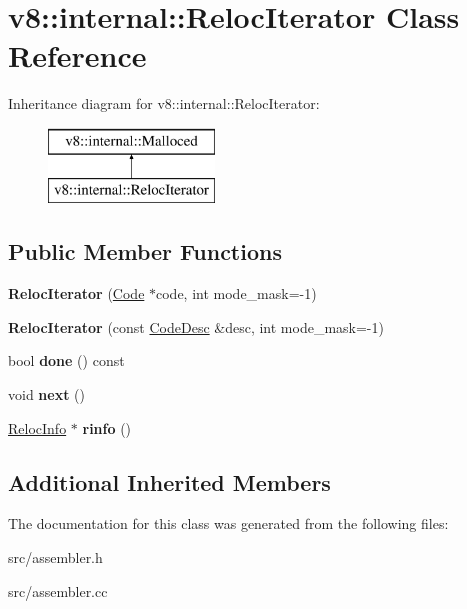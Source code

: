 \hypertarget{classv8_1_1internal_1_1_reloc_iterator}{}\section{v8\+:\+:internal\+:\+:Reloc\+Iterator Class Reference}
\label{classv8_1_1internal_1_1_reloc_iterator}
Inheritance diagram for v8\+:\+:internal\+:\+:Reloc\+Iterator\+:\begin{figure}[H]
\begin{center}
\leavevmode
\includegraphics[height=2.000000cm]{classv8_1_1internal_1_1_reloc_iterator}
\end{center}
\end{figure}
\subsection*{Public Member Functions}
\begin{DoxyCompactItemize}
\item 
\hypertarget{classv8_1_1internal_1_1_reloc_iterator_a43dacabd78f52d3771f87d0f7d268766}{}{\bfseries Reloc\+Iterator} (\hyperlink{classv8_1_1internal_1_1_code}{Code} $\ast$code, int mode\+\_\+mask=-\/1)\label{classv8_1_1internal_1_1_reloc_iterator_a43dacabd78f52d3771f87d0f7d268766}

\item 
\hypertarget{classv8_1_1internal_1_1_reloc_iterator_a861840bc6a67d6ca50beea9638133f70}{}{\bfseries Reloc\+Iterator} (const \hyperlink{structv8_1_1internal_1_1_code_desc}{Code\+Desc} \&desc, int mode\+\_\+mask=-\/1)\label{classv8_1_1internal_1_1_reloc_iterator_a861840bc6a67d6ca50beea9638133f70}

\item 
\hypertarget{classv8_1_1internal_1_1_reloc_iterator_afcee762df16f523a929920cf56735cb0}{}bool {\bfseries done} () const \label{classv8_1_1internal_1_1_reloc_iterator_afcee762df16f523a929920cf56735cb0}

\item 
\hypertarget{classv8_1_1internal_1_1_reloc_iterator_a92fcd0e86152eb3899352f7766b8bc05}{}void {\bfseries next} ()\label{classv8_1_1internal_1_1_reloc_iterator_a92fcd0e86152eb3899352f7766b8bc05}

\item 
\hypertarget{classv8_1_1internal_1_1_reloc_iterator_ac53f8a0cca6a7cc37f667295dfda7aea}{}\hyperlink{classv8_1_1internal_1_1_reloc_info}{Reloc\+Info} $\ast$ {\bfseries rinfo} ()\label{classv8_1_1internal_1_1_reloc_iterator_ac53f8a0cca6a7cc37f667295dfda7aea}

\end{DoxyCompactItemize}
\subsection*{Additional Inherited Members}


The documentation for this class was generated from the following files\+:\begin{DoxyCompactItemize}
\item 
src/assembler.\+h\item 
src/assembler.\+cc\end{DoxyCompactItemize}
